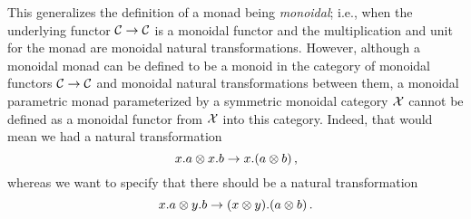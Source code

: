 \documentclass{article}
\begin{document}
\begin{remark}
  This generalizes the definition of a monad being \emph{monoidal}; i.e., when the underlying functor ${\mathcal{C}} \to {\mathcal{C}}$ is a monoidal functor and the multiplication and unit for the monad are monoidal natural transformations.  
  However, although a monoidal monad can be defined to be a monoid in the category of monoidal functors ${\mathcal{C}} \to {\mathcal{C}}$ and monoidal natural transformations between them, a monoidal parametric monad parameterized by a symmetric monoidal category $\mathcal X$ cannot be defined as a monoidal functor from $\mathcal X$ into this category.  
  Indeed, that would mean we had a natural transformation
  \[
    x.a \otimes x.b \to x.(a\otimes b)\,,
    \]
  whereas we want to specify that there should be a natural transformation
  \[
    x.a \otimes y.b \to (x\otimes y).(a\otimes b)\,.
    \]
\end{remark}
\end{document}

